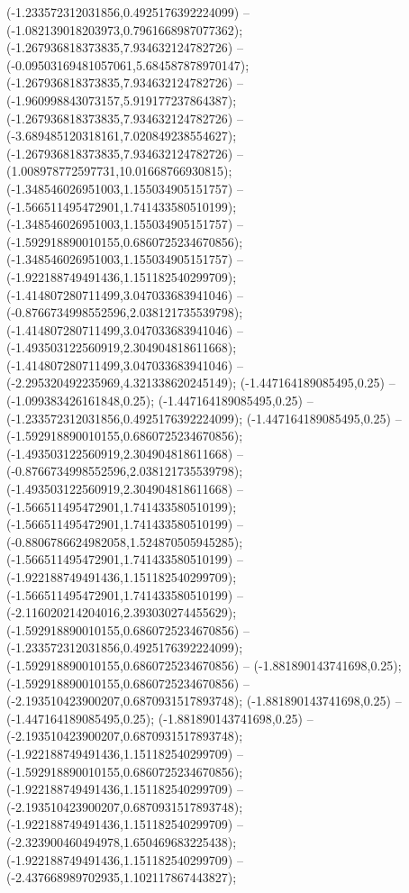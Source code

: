  (-1.233572312031856,0.4925176392224099) -- (-1.082139018203973,0.7961668987077362);
 (-1.267936818373835,7.934632124782726) -- (-0.09503169481057061,5.684587878970147);
 (-1.267936818373835,7.934632124782726) -- (-1.960998843073157,5.919177237864387);
 (-1.267936818373835,7.934632124782726) -- (-3.689485120318161,7.020849238554627);
 (-1.267936818373835,7.934632124782726) -- (1.008978772597731,10.01668766930815);
 (-1.348546026951003,1.155034905151757) -- (-1.566511495472901,1.741433580510199);
 (-1.348546026951003,1.155034905151757) -- (-1.592918890010155,0.6860725234670856);
 (-1.348546026951003,1.155034905151757) -- (-1.922188749491436,1.151182540299709);
 (-1.414807280711499,3.047033683941046) -- (-0.8766734998552596,2.038121735539798);
 (-1.414807280711499,3.047033683941046) -- (-1.493503122560919,2.304904818611668);
 (-1.414807280711499,3.047033683941046) -- (-2.295320492235969,4.321338620245149);
 (-1.447164189085495,0.25) -- (-1.099383426161848,0.25);
 (-1.447164189085495,0.25) -- (-1.233572312031856,0.4925176392224099);
 (-1.447164189085495,0.25) -- (-1.592918890010155,0.6860725234670856);
 (-1.493503122560919,2.304904818611668) -- (-0.8766734998552596,2.038121735539798);
 (-1.493503122560919,2.304904818611668) -- (-1.566511495472901,1.741433580510199);
 (-1.566511495472901,1.741433580510199) -- (-0.8806786624982058,1.524870505945285);
 (-1.566511495472901,1.741433580510199) -- (-1.922188749491436,1.151182540299709);
 (-1.566511495472901,1.741433580510199) -- (-2.116020214204016,2.393030274455629);
 (-1.592918890010155,0.6860725234670856) -- (-1.233572312031856,0.4925176392224099);
 (-1.592918890010155,0.6860725234670856) -- (-1.881890143741698,0.25);
 (-1.592918890010155,0.6860725234670856) -- (-2.193510423900207,0.6870931517893748);
 (-1.881890143741698,0.25) -- (-1.447164189085495,0.25);
 (-1.881890143741698,0.25) -- (-2.193510423900207,0.6870931517893748);
 (-1.922188749491436,1.151182540299709) -- (-1.592918890010155,0.6860725234670856);
 (-1.922188749491436,1.151182540299709) -- (-2.193510423900207,0.6870931517893748);
 (-1.922188749491436,1.151182540299709) -- (-2.323900460494978,1.650469683225438);
 (-1.922188749491436,1.151182540299709) -- (-2.437668989702935,1.102117867443827);
